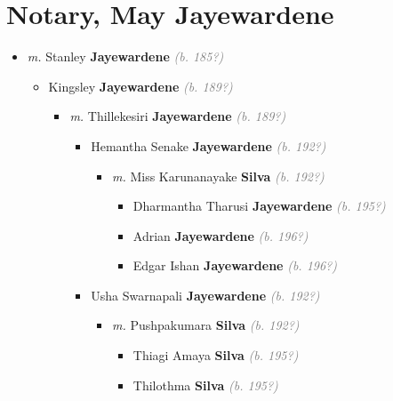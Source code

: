 \documentclass[10pt, openany]{book}
\begin{document}
\chapter{Notary, May Jayewardene}
\label{00003559}
\textcolor{slmaroon}{\textit{}}
\begin{itemize}
\item{\textit{m.} Stanley \textbf{Jayewardene} \textcolor{gray}{\textit{(b. 185?)}}   \label{couple:00003559:00003560} \begin{itemize}
\item{Kingsley  \textbf{Jayewardene} \textcolor{gray}{\textit{(b. 189?)}}
\begin{itemize}
\item{\textit{m.} Thillekesiri \textbf{Jayewardene} \textcolor{gray}{\textit{(b. 189?)}}   \label{couple:00003563:00003564} \begin{itemize}
\item{Hemantha Senake \textbf{Jayewardene} \textcolor{gray}{\textit{(b. 192?)}}
\begin{itemize}
\item{\textit{m.} Miss Karunanayake \textbf{Silva} \textcolor{gray}{\textit{(b. 192?)}}   \label{couple:00003565:00003566} \begin{itemize}
\item{Dharmantha Tharusi \textbf{Jayewardene} \textcolor{gray}{\textit{(b. 195?)}}
  }
\item{Adrian \textbf{Jayewardene} \textcolor{gray}{\textit{(b. 196?)}}
 }
\item{Edgar Ishan \textbf{Jayewardene} \textcolor{gray}{\textit{(b. 196?)}}
  }
\end{itemize}}
\end{itemize}
  }
\item{Usha Swarnapali \textbf{Jayewardene} \textcolor{gray}{\textit{(b. 192?)}}
\begin{itemize}
\item{\textit{m.} Pushpakumara \textbf{Silva} \textcolor{gray}{\textit{(b. 192?)}}   \label{couple:00003570:00003571} \begin{itemize}
\item{Thiagi Amaya \textbf{Silva} \textcolor{gray}{\textit{(b. 195?)}}
  }
\item{Thilothma \textbf{Silva} \textcolor{gray}{\textit{(b. 195?)}}
}
\end{itemize}}
\end{itemize}}
\end{itemize}}
\end{itemize}}
\end{itemize}}
\end{itemize}
\end{document}
